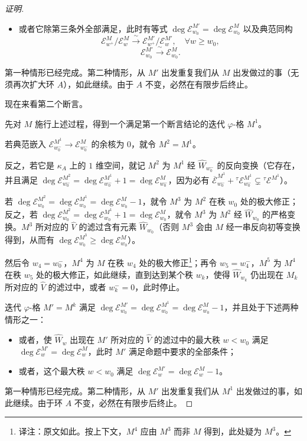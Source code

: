\begin{proof}[证明]
\begin{itemize}
\item 或者它除第三条外全部满足，此时有等式 $\deg \mathcal{E}^{M'}_{w_0} = \deg \mathcal{E}^M_{w_0}$ 以及典范同构
\[
\mathcal{E}^M_{w^+}/\mathcal{E}^M_w \xrightarrow{\ \sim\ } \mathcal{E}^{M'}_{w^+}/\mathcal{E}^{M'}_w, \quad \forall w \ge w_0,
\]
\[
\mathcal{E}^{M'}_{w_0} \xrightarrow{\ \sim\ } \mathcal{E}^M_{w_0}.
\]
\end{itemize}

第一种情形已经完成。第二种情形，从 $M'$ 出发重复我们从 $M$ 出发做过的事（无须再次扩大环 $A$），如此继续。由于 $A$ 不变，必然在有限步后终止。

现在来看第二个断言。

先对 $M$ 施行上述过程，得到一个满足第一个断言结论的迭代 $\varphi$-格 $M^1$。

若典范嵌入 $\mathcal{E}^{M^1}_{w_0^-} \longrightarrow \mathcal{E}^M_{w_0^-}$ 的余核为 $0$，就令 $M^2 = M^1$。

反之，若它是 $\kappa_A$ 上的 $1$ 维空间，就记 $M^2$ 为 $M^1$ 经 $\widehat{W}_{w_0^-}$ 的反向变换（它存在，并且满足 $\deg \mathcal{E}^{M^2}_{w_0^-} = \deg \mathcal{E}^{M^1}_{w_0^-} + 1 = \deg \mathcal{E}^M_{w_0^-}$，因为必有 $\overline{\mathcal{E}}^{M^1}_{w_0^-} + {}^\tau\mathcal{E}^{M^1}_{w_0^-} \subsetneq {}^\tau\mathcal{E}^{M^1}$）。

若 $\deg \mathcal{E}^{M^2}_{w_0} = \deg \mathcal{E}^{M^1}_{w_0} = \deg \mathcal{E}^M_{w_0} - 1$，就令 $M^3$ 为 $M^2$ 在秩 $w_0$ 处的极大修正；反之，若 $\deg \mathcal{E}^{M^2}_{w_0} = \deg \mathcal{E}^{M^1}_{w_0} + 1 = \deg \mathcal{E}^M_{w_0}$，就令 $M^3$ 为 $M^2$ 经 $\widehat{W}_{w_0}$ 的严格变换。$M^3$ 所对应的 $\widehat{V}$ 的滤过含有元素 $\widehat{W}_{w_0}$（否则 $M^3$ 会由 $M$ 经一串反向初等变换得到，从而有 $\deg \mathcal{E}^{M^3}_{w_0} \geq \deg \mathcal{E}^M_{w_0}$）。

然后令 $w_4 = w_0^-$，$M^4$ 为 $M$ 在秩 $w_4$ 处的极大修正\footnote{译注：原文如此。按上下文，$M^4$ 应由 $M^3$ 而非 $M$ 得到，此处疑为 $M^3$。}；再令 $w_5 = w_4^-$，$M^5$ 为 $M^4$ 在秩 $w_5$ 处的极大修正，如此继续，直到达到某个秩 $w_k$，使得 $\widehat{W}_{w_k}$ 仍出现在 $M_k$ 所对应的 $\widehat{V}$ 的滤过中，或者 $w_k^- = 0$，此时停止。

迭代 $\varphi$-格 $M' = M^k$ 满足 $\deg \mathcal{E}^{M'}_{w_0} = \deg \mathcal{E}^{M^1}_{w_0} = \deg \mathcal{E}^M_{w_0} - 1$，并且处于下述两种情形之一：

\begin{itemize}
\item 或者，使 $\widehat{W}_w$ 出现在 $M'$ 所对应的 $\widehat{V}$ 的滤过中的最大秩 $w < w_0$ 满足 $\deg \mathcal{E}^{M'}_w = \deg \mathcal{E}^M_w$，此时 $M'$ 满足命题中要求的全部条件；

\item 或者，这个最大秩 $w < w_0$ 满足 $\deg \mathcal{E}^{M'}_w = \deg \mathcal{E}^M_w - 1$。
\end{itemize}

第一种情形已经完成。第二种情形，从 $M'$ 出发重复我们从 $M^1$ 出发做过的事，如此继续。由于环 $A$ 不变，必然在有限步后终止。
\end{proof}

